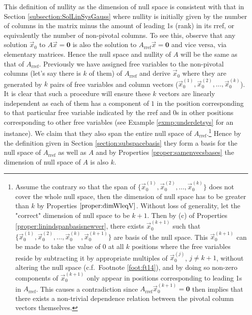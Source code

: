 This definition of nullity as the dimension of null space is consistent with that in Section \ref{subsection:SolLinSysGauss} where nullity is initially given by the number of columns in the matrix minus the amount of leading 1s (rank) in its rref, or equivalently the number of non-pivotal columns. To see this, observe that any solution $\vec{x}_0$ to $A\vec{x} = \textbf{0}$ is also the solution to $A_{\text{rref}}\vec{x} = \textbf{0}$ and vice versa, via elementary matrices. Hence the null space and nullity of $A$ will be the same as that of $A_{\text{rref}}$. Previously we have assigned free variables to the non-pivotal columns (let's say there is $k$ of them) of $A_{\text{rref}}$ and derive $\vec{x}_0$ where they are generated by $k$ pairs of free variables and column vectors ($\vec{x}_0^{(1)}, \vec{x}_0^{(2)}, \ldots, \vec{x}_0^{(k)}$). It is clear that such a procedure will ensure these $k$ vectors are linearly independent as each of them has a component of $1$ in the position corresponding to that particular free variable indicated by the rref and $0$s in other positions corresponding to other free variables (see Example \ref{exmp:underdetsys} for an instance). We claim that they also span the entire null space of $A_{\text{rref}}$.\footnote{Assume the contrary so that the span of $\{\vec{x}_0^{(1)}, \vec{x}_0^{(2)}, \ldots, \vec{x}_0^{(k)}\}$ does not cover the whole null space, then the dimension of null space has to be greater than $k$ by Properties $\ref{proper:dimWleqV}$. Without loss of generality, let the "correct" dimension of null space to be $k+1$. Then by (c) of Properties \ref{proper:linindspanbasisnewver}, there exists $\vec{x}_0^{(k+1)}$ such that $\{\vec{x}_0^{(1)}, \vec{x}_0^{(2)}, \ldots, \vec{x}_0^{(k)}, \vec{x}_0^{(k+1)}\}$ are basis of the null space. This $\vec{x}_0^{(k+1)}$ can be made to take the value of $0$ at all $k$ positions where the free variables reside by subtracting it by appropriate multiples of $\vec{x}_0^{(j)}$, $j \neq k+1$, without altering the null space (c.f.\ Footnote \ref{foot:ft14}), and by doing so non-zero components of $\vec{x}_0^{(k+1)}$ only appear in positions corresponding to leading 1s in $A_{\text{rref}}$. This causes a contradiction since $A_{\text{rref}}\vec{x}_0^{(k+1)} = \textbf{0}$ then implies that there exists a non-trivial dependence relation between the pivotal column vectors themselves.} Hence by the definition given in Section \ref{section:subspacebasis} they form a basis for the null space of $A_{\text{rref}}$ as well as $A$ and by Properties \ref{proper:samenvecsbases} the dimension of null space of $A$ is also $k$.

